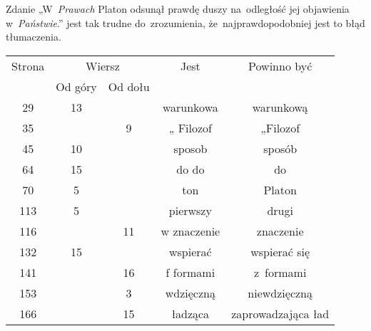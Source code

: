 \documentclass[a4paper,11pt]{article}
\begin{document}
\vspace{\spaceFour}





\noindent
{} Zdanie „W~\textit{Prawach} Platon odsunął prawdę
duszy na~odległość jej objawienia w~\textit{Państwie}.” jest tak trudne
do~zrozumienia, że~najprawdopodobniej jest to błąd tłumaczenia.





\newpage



\begin{center}

  \begin{tabular}{|c|c|c|c|c|}
    \hline
    Strona & \multicolumn{2}{c|}{Wiersz} & Jest
                              & Powinno być \\ \cline{2-3}
    & Od góry & Od dołu & & \\
    \hline
    29  & 13 & & warunkowa & warunkową \\
    35  & &  9 & „ Filozof & „Filozof \\
    45  & 10 & & sposob & sposób \\
    64  & 15 & & do do & do \\
    70  &  5 & & ton & Platon \\
    113 &  5 & & pierwszy & drugi \\
    116 & & 11 & w znaczenie & znaczenie \\
    132 & 15 & & wspierać & wspierać się \\
    141 & & 16 & f formami & z~formami \\
    153 & &  3 & wdzięczną & niewdzięczną \\
    166 & & 15 & ładząca & zaprowadzająca ład \\
    \hline
  \end{tabular}

\end{center}

\vspace{\spaceTwo}













\newpage
\end{document}
